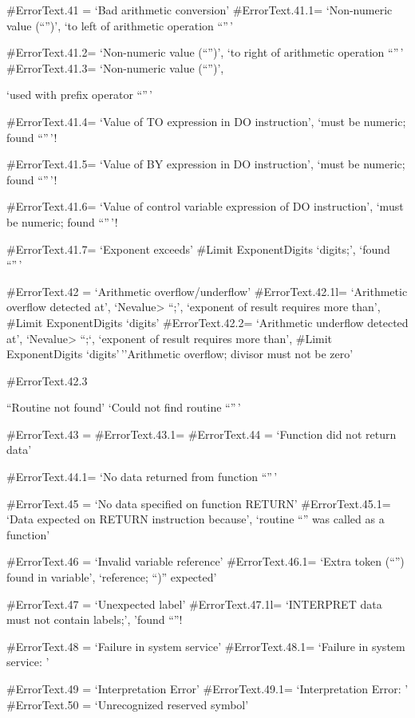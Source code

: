 \#ErrorText.41 = `Bad arithmetic conversion' \#ErrorText.41.1=
`Non-numeric value (``'')', `to left of arithmetic operation ``''\,'

\#ErrorText.41.2= `Non-numeric value (``'')', `to right of arithmetic
operation ``''\,' \#ErrorText.41.3= `Non-numeric value (``'')',

`used with prefix operator ``''\,'

\#ErrorText.41.4= `Value of TO expression in DO instruction', `must be
numeric; found ``''\,'!

\#ErrorText.41.5= `Value of BY expression in DO instruction', `must be
numeric; found ``''\,'!

\#ErrorText.41.6= `Value of control variable expression of DO
instruction', `must be numeric; found ``''\,'!

\#ErrorText.41.7= `Exponent exceeds' \#Limit ExponentDigits `digits;',
`found ``''\,'

\#ErrorText.42 = `Arithmetic overflow/underflow' \#ErrorText.42.1l=
`Arithmetic overflow detected at', `Nevalue\textgreater{} ``;',
`exponent of result requires more than', \#Limit ExponentDigits `digits'
\#ErrorText.42.2= `Arithmetic underflow detected at',
`Nevalue\textgreater{} ``;`, `exponent of result requires more than',
\#Limit ExponentDigits `digits'\,''Arithmetic overflow; divisor must not
be zero'

\#ErrorText.42.3

``Routine not found' `Could not find routine ``''\,'

\#ErrorText.43 = \#ErrorText.43.1= \#ErrorText.44 = `Function did not
return data'

\#ErrorText.44.1= `No data returned from function ``''\,'

\#ErrorText.45 = `No data specified on function RETURN'
\#ErrorText.45.1= `Data expected on RETURN instruction because',
`routine ``'' was called as a function'

\#ErrorText.46 = `Invalid variable reference' \#ErrorText.46.1= `Extra
token (``'') found in variable', `reference; ``)'' expected'

\#ErrorText.47 = `Unexpected label' \#ErrorText.47.1l= `INTERPRET data
must not contain labels;', 'found ``''!

\#ErrorText.48 = `Failure in system service' \#ErrorText.48.1= `Failure
in system service: '

\#ErrorText.49 = `Interpretation Error' \#ErrorText.49.1=
`Interpretation Error: ' \#ErrorText.50 = `Unrecognized reserved symbol'

